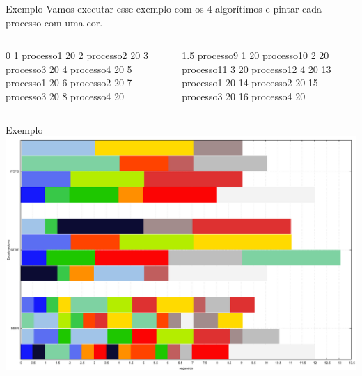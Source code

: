 \documentclass{beamer}
\begin{document}
\begin{frame}{Exemplo}
	Vamos executar esse exemplo com os 4 algorítimos e pintar cada processo com uma cor.
	\begin{columns}[T,onlytextwidth]
		
		0 1 processo1 20  2 processo2 20  3 processo3 20  4 processo4 20  5 processo1 20  6 processo2 20  7 processo3 20  8 processo4 20 \newline
		
		
		
		
		1.5 processo9 1 20  processo10 2 20  processo11 3 20  processo12 4 20  13 processo1 20  14 processo2 20  15 processo3 20  16 processo4 20
		
		
	\end{columns}
\end{frame}

\begin{frame}{Exemplo}
	\includegraphics[width=\textwidth]{graphs/comparacao}
\end{frame}
\end{document}
